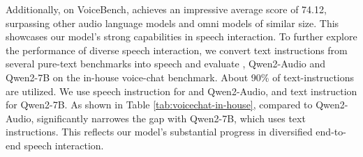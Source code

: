 Additionally, on VoiceBench, \method achieves an impressive average score of 74.12, surpassing other audio language models and omni models of similar size. This showcases our model's strong capabilities in speech interaction.
To further explore the performance of diverse speech interaction, we convert text instructions from several pure-text benchmarks into speech and evaluate \method, Qwen2-Audio and Qwen2-7B on the in-house voice-chat benchmark. About 90\% of text-instructions are utilized. We use speech instruction for \method and Qwen2-Audio, and text instruction for Qwen2-7B. 
As shown in Table \ref{tab:voicechat-in-house}, compared to Qwen2-Audio, \method significantly narrowes the gap with Qwen2-7B, which uses text instructions. This reflects our model's substantial progress in diversified end-to-end speech interaction.

